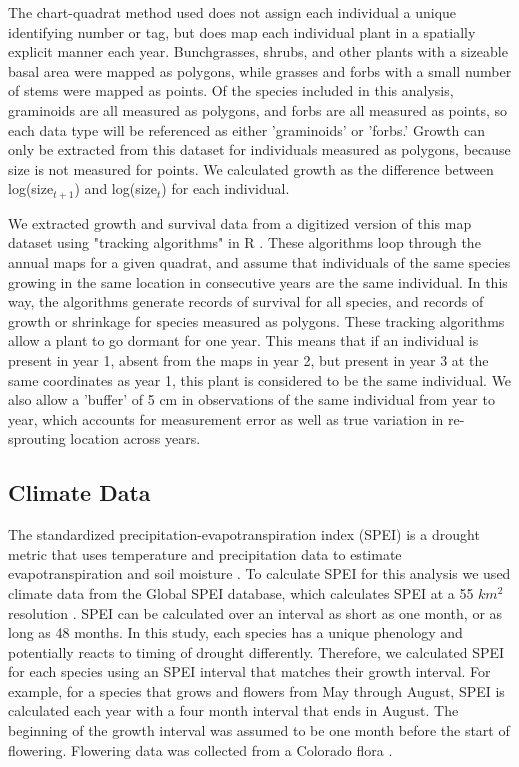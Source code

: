 \documentclass[12pt, letterpaper]{article}
\begin{document}
The chart-quadrat method used does not assign each individual a unique identifying number or tag, but does map each individual plant in a spatially explicit manner each year. Bunchgrasses, shrubs, and other plants with a sizeable basal area were mapped as polygons, while grasses and forbs with a small number of stems were mapped as points. Of the species included in this analysis, graminoids are all measured as polygons, and forbs are all measured as points, so each data type will be referenced as either 'graminoids' or 'forbs.' Growth can only be extracted from this dataset for individuals measured as polygons, because size is not measured for points. We calculated growth as the difference between log(size$_{t+1}$) and log(size$_t$) for each individual.  

We extracted growth and survival data from a digitized version of this map dataset using "tracking algorithms" in R \citep{Lauenroth2008, RCoreTeam2019}. These algorithms loop through the annual maps for a given quadrat, and assume that individuals of the same species growing in the same location in consecutive years are the same individual. In this way, the algorithms generate records of survival for all species, and records of growth or shrinkage for species measured as polygons. These tracking algorithms allow a plant to go dormant for one year. This means that if an individual is present in year 1, absent from the maps in year 2, but present in year 3 at the same coordinates as year 1, this plant is considered to be the same individual. We also allow a 'buffer' of 5 cm in observations of the same individual from year to year, which accounts for measurement error as well as true variation in re-sprouting location across years. 
\subsection{Climate Data} The standardized precipitation-evapotranspiration index (SPEI) is a drought metric that uses temperature and precipitation data to estimate evapotranspiration and soil moisture \citep{Vicente-Serrano2010}.  To calculate SPEI for this analysis we used climate data from the Global SPEI database, which calculates SPEI at a 55 $km^2$ resolution \citep{Vicente-Serrano2010}. SPEI can be calculated over an interval as short as one month, or as long as 48 months. In this study, each species has a unique phenology and potentially reacts to timing of drought differently. Therefore, we calculated SPEI for each species using an SPEI interval that matches their growth interval. For example, for a species that grows and flowers from May through August, SPEI is calculated each year with a four month interval that ends in August. The beginning of the growth interval was assumed to be one month before the start of flowering. Flowering data was collected from a Colorado flora \citep{Ackerfield2015}.  
\end{document}
